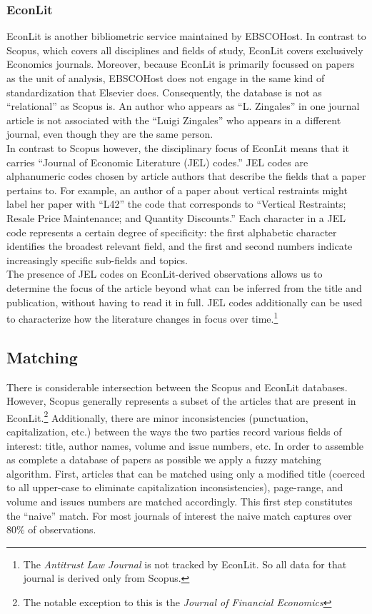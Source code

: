 \documentclass[11pt, letterpaper, twoside]{article}
\begin{document}
\subsubsection{EconLit}
EconLit is another bibliometric service maintained by EBSCOHost. In contrast to Scopus, which covers all disciplines and fields of study, EconLit covers exclusively Economics journals. Moreover, because EconLit is primarily focussed on papers as the unit of analysis, EBSCOHost does not engage in the same kind of standardization that Elsevier does. Consequently, the database is not as ``relational'' as Scopus is. An author who appears as ``L. Zingales'' in one journal article is not associated with the ``Luigi Zingales'' who appears in a different journal, even though they are the same person.\\

In contrast to Scopus however, the disciplinary focus of EconLit means that it carries ``Journal of Economic Literature (JEL) codes.'' JEL codes are alphanumeric codes chosen by article authors that describe the fields that a paper pertains to. For example, an author of a paper about vertical restraints might label her paper with ``L42'' the code that corresponds to ``Vertical Restraints; Resale Price Maintenance; and Quantity Discounts.'' Each character in a JEL code represents a certain degree of specificity: the first alphabetic character identifies the broadest relevant field, and the first and second numbers indicate increasingly specific sub-fields and topics.\\

The presence of JEL codes on EconLit-derived observations allows us to determine the focus of the article beyond what can be inferred from the title and publication, without having to read it in full. JEL codes additionally can be used to characterize how the literature changes in focus over time.\footnote{The \textit{Antitrust Law Journal} is not tracked by EconLit. So all data for that journal is derived only from Scopus.}

\subsection{Matching}

There is considerable intersection between the Scopus and EconLit databases. However, Scopus generally represents a subset of the articles that are present in EconLit.\footnote{The notable exception to this is the \textit{Journal of Financial Economics}} Additionally, there are minor inconsistencies (punctuation, capitalization, etc.) between the ways the two parties record various fields of interest: title, author names, volume and issue numbers, etc. In order to assemble as complete a database of papers as possible we apply a fuzzy matching algorithm. First, articles that can be matched using only a modified title (coerced to all upper-case to eliminate capitalization inconsistencies), page-range, and volume and issues numbers are matched accordingly. This first step constitutes the ``naive'' match. For most journals of interest the naive match captures over 80\% of observations.\\
\end{document}
